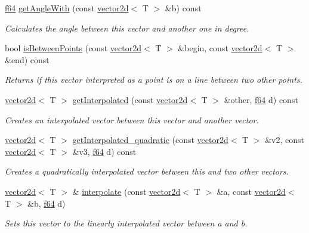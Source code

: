 \begin{DoxyCompactItemize}
\hyperlink{namespaceirr_a1325b02603ad449f92c68fc640af9b28}{f64} \hyperlink{classirr_1_1core_1_1vector2d_a82714b4037cc4985992647ea69974a60}{get\+Angle\+With} (const \hyperlink{classirr_1_1core_1_1vector2d}{vector2d}$<$ T $>$ \&b) const
\begin{DoxyCompactList}\small\item\em Calculates the angle between this vector and another one in degree. \end{DoxyCompactList}\item 
bool \hyperlink{classirr_1_1core_1_1vector2d_aeaf8fc27c46894825b3d84ff47f08a4a}{is\+Between\+Points} (const \hyperlink{classirr_1_1core_1_1vector2d}{vector2d}$<$ T $>$ \&begin, const \hyperlink{classirr_1_1core_1_1vector2d}{vector2d}$<$ T $>$ \&end) const
\begin{DoxyCompactList}\small\item\em Returns if this vector interpreted as a point is on a line between two other points. \end{DoxyCompactList}\item 
\hyperlink{classirr_1_1core_1_1vector2d}{vector2d}$<$ T $>$ \hyperlink{classirr_1_1core_1_1vector2d_ac800722ea56bf8878dc7b67d490464c3}{get\+Interpolated} (const \hyperlink{classirr_1_1core_1_1vector2d}{vector2d}$<$ T $>$ \&other, \hyperlink{namespaceirr_a1325b02603ad449f92c68fc640af9b28}{f64} d) const
\begin{DoxyCompactList}\small\item\em Creates an interpolated vector between this vector and another vector. \end{DoxyCompactList}\item 
\hyperlink{classirr_1_1core_1_1vector2d}{vector2d}$<$ T $>$ \hyperlink{classirr_1_1core_1_1vector2d_aa4bfe9ae4f1e354eeac2ee8d9c2ca7fd}{get\+Interpolated\+\_\+quadratic} (const \hyperlink{classirr_1_1core_1_1vector2d}{vector2d}$<$ T $>$ \&v2, const \hyperlink{classirr_1_1core_1_1vector2d}{vector2d}$<$ T $>$ \&v3, \hyperlink{namespaceirr_a1325b02603ad449f92c68fc640af9b28}{f64} d) const
\begin{DoxyCompactList}\small\item\em Creates a quadratically interpolated vector between this and two other vectors. \end{DoxyCompactList}\item 
\hyperlink{classirr_1_1core_1_1vector2d}{vector2d}$<$ T $>$ \& \hyperlink{classirr_1_1core_1_1vector2d_a85bc48f5c313764fd56b51c730a62210}{interpolate} (const \hyperlink{classirr_1_1core_1_1vector2d}{vector2d}$<$ T $>$ \&a, const \hyperlink{classirr_1_1core_1_1vector2d}{vector2d}$<$ T $>$ \&b, \hyperlink{namespaceirr_a1325b02603ad449f92c68fc640af9b28}{f64} d)
\begin{DoxyCompactList}\small\item\em Sets this vector to the linearly interpolated vector between a and b. \end{DoxyCompactList}\end{DoxyCompactItemize}
